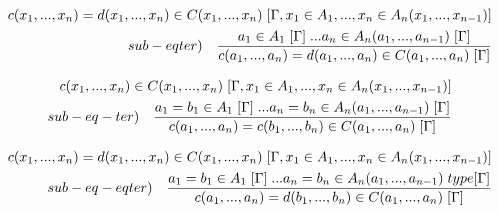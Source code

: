\begin{equation}
\begin{split}
c(x_1,...,x_n) = d(x_1,...,x_n)  \in C(x_1,...,x_n) \hspace{0.1cm}[\Gamma, x_1 \in A_1,...,x_n \in A_n(x_1,...,x_{n-1})] \\ sub-eqter) \quad \frac{a_1 \in A_1\hspace{0.1cm}[\Gamma]\hspace{0.1cm}...a_n \in A_n(a_1,...,a_{n-1})\hspace{0.1cm}[\Gamma]}{ c(a_1,...,a_n) = d(a_1,...,a_n) \in C(a_1,...,a_n)\hspace{0.1cm}[\Gamma]}
\end{split}
\end{equation}

\begin{equation}
\begin{split}
c(x_1,...,x_n) \in C(x_1,...,x_n) \hspace{0.1cm}[\Gamma, x_1 \in A_1,...,x_n \in A_n(x_1,...,x_{n-1})] \\ sub-eq-ter) \quad \frac{a_1 = b_1 \in A_1\hspace{0.1cm}[\Gamma]\hspace{0.1cm}...a_n = b_n \in A_n(a_1,...,a_{n-1})\hspace{0.1cm}[\Gamma]}{ c(a_1,...,a_n) = c(b_1,...,b_n) \in C(a_1,...,a_n)\hspace{0.1cm}[\Gamma]}
\end{split}
\end{equation}

\begin{equation}
\begin{split}
c(x_1,...,x_n) = d(x_1,...,x_n) \in C(x_1,...,x_n) \hspace{0.1cm}[\Gamma, x_1 \in A_1,...,x_n \in A_n(x_1,...,x_{n-1})] \\ sub-eq-eqter) \quad \frac{a_1 = b_1 \in A_1\hspace{0.1cm}[\Gamma]\hspace{0.1cm}...a_n = b_n \in A_n(a_1,...,a_{n-1})\hspace{0.1cm}type[\Gamma]}{ c(a_1,...,a_n) = d(b_1,...,b_n) \in C(a_1,...,a_n)\hspace{0.1cm}[\Gamma]}
\end{split}
\end{equation}

